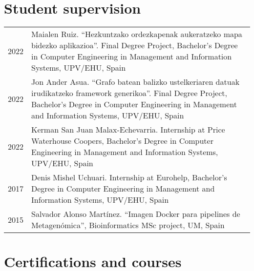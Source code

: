\documentclass[11pt,fullpage]{article}
\begin{document}
\section*{Student supervision}

\begin{longtable}{p{0.5in}|p{5.5in}}

2022 & Maialen Ruiz. ``Hezkuntzako ordezkapenak aukeratzeko mapa bidezko aplikazioa''. Final Degree Project, Bachelor's Degree in Computer Engineering in Management and Information Systems, UPV/EHU, Spain \\
2022 & Jon Ander Asua. ``Grafo batean balizko ustelkeriaren datuak irudikatzeko framework generikoa''. Final Degree Project, Bachelor's Degree in Computer Engineering in Management and Information Systems, UPV/EHU, Spain \\
2022 & Kerman San Juan Malax-Echevarria. Internship at Price Waterhouse Coopers, Bachelor's Degree in Computer Engineering in Management and Information Systems, UPV/EHU, Spain  \\
2017 & Denis Mishel Uchuari. Internship at Eurohelp, Bachelor's Degree in Computer Engineering in Management and Information Systems, UPV/EHU, Spain \\
2015 & Salvador Alonso Mart\'inez. ``Imagen Docker para pipelines de Metagen\'omica'', Bioinformatics MSc project, UM, Spain \\

\end{longtable}

\section*{Certifications and courses}
\end{document}
